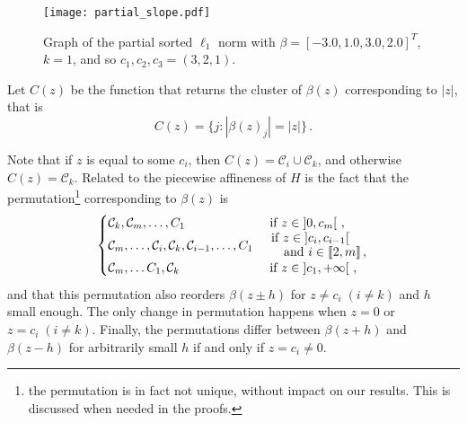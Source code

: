 \begin{figure}[htbp]
  \centering
  \texttt{[image: partial\_slope.pdf]}
  \caption{Graph of the partial sorted $\ell_1$ norm with \(\beta = [-3.0, 1.0, 3.0, 2.0]^T\), \(k = 1\), and so $c_1, c_2, c_3 = (3, 2, 1)$.}
  \label{fig:partial_slope}
\end{figure}

Let \(C(z)\) be the function that returns the cluster of $\beta(z)$ corresponding to \(|z|\), that is
\begin{equation}
  C(z) = \{j : |\beta(z)_j| = |z|\} \,.
\end{equation}

\begin{remark}\label{rem:permutation_C_z}
  Note that if $z$ is equal to some $c_i$, then $C(z) = \mathcal{C}_i \cup \mathcal{C}_k$, and otherwise $C(z) = \mathcal{C}_k$.
  Related to the piecewise affineness of $H$ is the fact that the permutation\footnote{the permutation is in fact not unique, without impact on our results. This is discussed when needed in the proofs.} corresponding to $\beta(z)$ is
  \begin{equation*}
    \begin{cases}
    \cC_k, \cC_m, \ldots, C_1
        &\text{ if } z \in \left]0, c_m\right[ \, , \\
    \cC_m, \ldots ,\cC_i, \cC_k, \cC_{i-1}, \ldots, C_1
        &\splitfrac{\text{ if } z \in \left]c_{i}, c_{i-1} \right[}{\text{ and } i \in \llbracket 2 , m \rrbracket\, ,} \\
    \cC_m, \ldots C_1,  \cC_k
        &\text{ if } z \in \left]c_1, +\infty \right[ \, , \\
    \end{cases}
  \end{equation*}
  and that this permutation also reorders $\beta(z \pm h)$ for $z \neq c_i \; (i \neq k)$ and $h$ small enough.
  The only change in permutation happens when $z = 0$ or $z = c_i \; (i \neq k)$.
  Finally, the permutations differ between $\beta(z + h)$ and $\beta(z - h)$ for arbitrarily small $h$ if and only if $z = c_i \neq 0$.
\end{remark}

